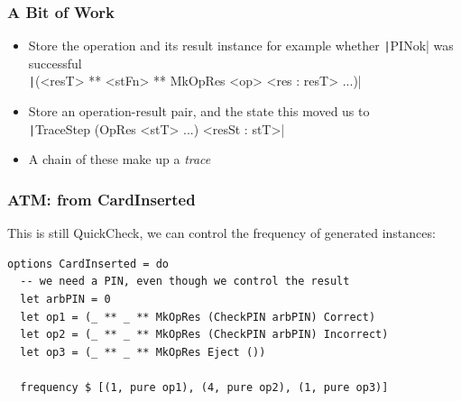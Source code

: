 \documentclass[compress]{beamer}
\begin{document}
\begin{frame}[fragile]
  \frametitle{A Bit of Work}

  \large

  \begin{itemize}
    \item<1-> Store the operation and its result instance {\textemdash} for
              example whether \texttt|PINok| was successful\\
              \texttt|(<resT> ** <stFn> ** MkOpRes <op> <res : resT> ...)|
    \item<2-> Store an operation-result pair, and the state this moved
              us to\\
              \texttt|TraceStep (OpRes <stT> ...) <resSt : stT>|
    \item<3-> A chain of these make up a \emph{trace}
  \end{itemize}

\end{frame}




\begin{frame}[fragile]
  \frametitle{ATM: from CardInserted}

  \large

  This is still QuickCheck, we can control the frequency of generated instances:

  \begin{verbatim}
options CardInserted = do
  -- we need a PIN, even though we control the result
  let arbPIN = 0
  let op1 = (_ ** _ ** MkOpRes (CheckPIN arbPIN) Correct)
  let op2 = (_ ** _ ** MkOpRes (CheckPIN arbPIN) Incorrect)
  let op3 = (_ ** _ ** MkOpRes Eject ())

  frequency $ [(1, pure op1), (4, pure op2), (1, pure op3)]
  \end{verbatim}

\end{frame}
\end{document}
